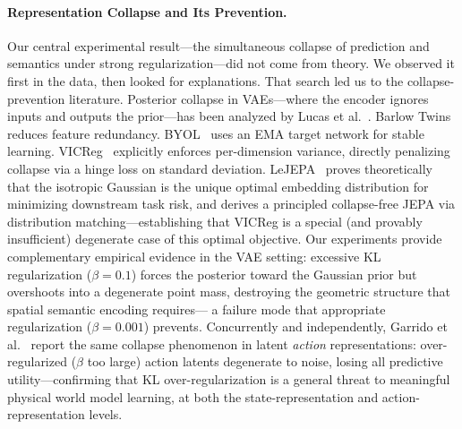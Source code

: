 \documentclass{article}
\begin{document}
\paragraph{Representation Collapse and Its Prevention.}
Our central experimental result---the simultaneous collapse of prediction
and semantics under strong regularization---did not come from theory.
We observed it first in the data, then looked for explanations.
That search led us to the collapse-prevention literature.
Posterior collapse in VAEs---where the encoder ignores inputs and outputs
the prior---has been analyzed by Lucas et al.~\cite{lucas2019dont}.
Barlow Twins~\cite{zbontar2021barlow} reduces feature redundancy.
BYOL~\cite{grill2020byol} uses an EMA target network for stable learning.
VICReg~\cite{bardes2022vicreg} explicitly enforces per-dimension variance,
directly penalizing collapse via a hinge loss on standard deviation.
LeJEPA~\cite{balestriero2024lejepa} proves theoretically that the isotropic
Gaussian is the unique optimal embedding distribution for minimizing
downstream task risk, and derives a principled collapse-free JEPA
via distribution matching---establishing that VICReg is a special
(and provably insufficient) degenerate case of this optimal objective.
Our experiments provide complementary empirical evidence in the VAE setting:
excessive KL regularization ($\beta\!=\!0.1$) forces the posterior
toward the Gaussian prior but overshoots into a degenerate point mass,
destroying the geometric structure that spatial semantic encoding requires---
a failure mode that appropriate regularization ($\beta\!=\!0.001$) prevents.
Concurrently and independently, Garrido et al.~\cite{garrido2026lam}
report the same collapse phenomenon in latent \emph{action} representations:
over-regularized ($\beta$ too large) action latents degenerate to noise,
losing all predictive utility---confirming that KL over-regularization
is a general threat to meaningful physical world model learning,
at both the state-representation and action-representation levels.
\end{document}
